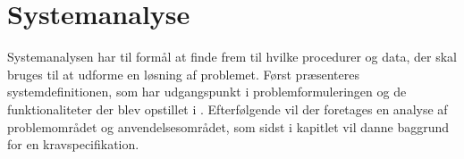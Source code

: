 \chapter{Systemanalyse}\label{chapter:systemanalyse}
Systemanalysen har til formål at finde frem til hvilke procedurer og data, der skal bruges til at udforme en løsning af problemet.
Først præsenteres systemdefinitionen, som har udgangspunkt i problemformuleringen og de funktionaliteter der blev opstillet i .
Efterfølgende vil der foretages en analyse af problemområdet og anvendelsesområdet, som sidst i kapitlet vil danne baggrund for en kravspecifikation.






